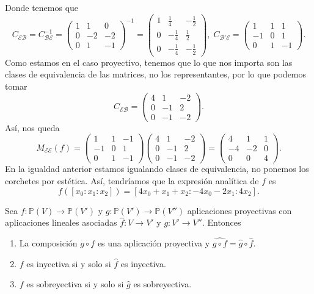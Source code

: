 \begin{eg}
Donde tenemos que 
\[C_{\mathcal{E}\mathcal{B}} = C_{\mathcal{B}\mathcal{E}}^{-1} = \begin{pmatrix} 1 & 1 & 0 \\ 0 & - 2 & - 2 \\ 0 & 1 & -1 \end{pmatrix}^{-1} = \begin{pmatrix} 1 & \frac{1}{4} & -\frac{1}{2} \\ 0 & -\frac{1}{4} & \frac{1}{2} \\ 0 & -\frac{1}{4} & -\frac{1}{2} \end{pmatrix}, \; C_{\mathcal{B}'\mathcal{E}} = \begin{pmatrix} 1 & 1 & 1 \\ -1 & 0 & 1 \\ 0 & 1 & -1 \end{pmatrix} .\]
Como estamos en el caso proyectivo, tenemos que lo que nos importa son las clases de equivalencia de las matrices, no los representantes, por lo que podemos tomar
\[ C_{\mathcal{E}\mathcal{B}} = \begin{pmatrix} 4 & 1 & - 2 \\ 0 & - 1 & 2 \\ 0 & - 1 & - 2 \end{pmatrix} .\]
Así, nos queda
\[M_{\mathcal{E}\mathcal{E}}\left(f\right) = \begin{pmatrix} 1 & 1 & -1 \\ -1 & 0 & 1 \\ 0 & 1 & - 1 \end{pmatrix}\begin{pmatrix} 4 & 1 & -2\\ 0 & - 1 & 2 \\ 0 & - 1 & -2 \end{pmatrix} = \begin{pmatrix} 4 & 1 & 1 \\ -4 & -2 & 0 \\ 0 & 0 & 4 \end{pmatrix} .\]
En la igualdad anterior estamos igualando clases de equivalencia, no ponemos los corchetes por estética. Así, tendríamos que la expresión analítica de $\displaystyle f $ es
\[f\left([x_{0}:x_{1}:x_{2}]\right) = [4x_{0}+x_{1}+x_{2}:-4x_{0}-2x_{1}:4x_{2}] .\]
\end{eg}
\begin{prop}
Sea $\displaystyle f : \mathbb{P}\left(V\right) \to \mathbb{P}\left(V'\right) $ y $\displaystyle g : \mathbb{P}\left(V'\right) \to \mathbb{P}\left(V''\right) $ aplicaciones proyectivas con aplicaciones lineales asociadas $\displaystyle \hat{f} : V \to V' $ y $\displaystyle g : V' \to V'' $. Entonces
\begin{enumerate}
\item La composición $\displaystyle g\circ f $ es una aplicación proyectiva y $\displaystyle \hat{g \circ f} =\hat{g}\circ\hat{f} $.
\item $\displaystyle f $ es inyectiva si y solo si $\displaystyle \hat{f} $ es inyectiva.
\item $\displaystyle f $ es sobreyectiva si y solo si $\displaystyle \hat{g} $ es sobreyectiva.
\end{enumerate}
\end{prop}

